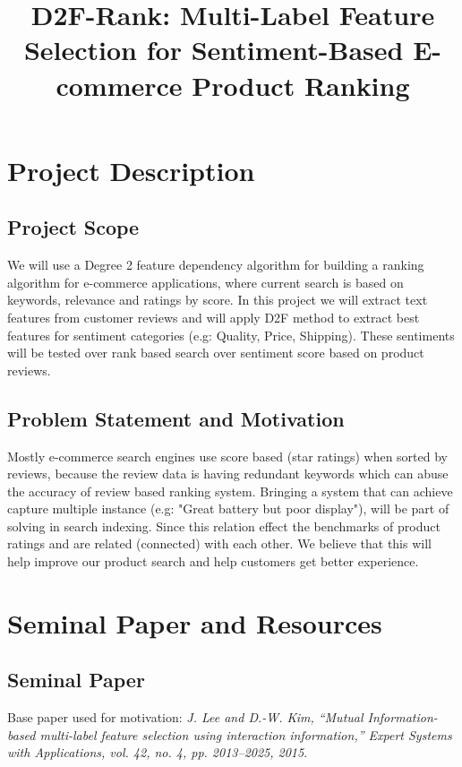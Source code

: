 \documentclass[conference]{IEEEtran}
\begin{document}
\title{D2F-Rank: Multi-Label Feature Selection for Sentiment-Based E-commerce Product Ranking}

\author{
}

\maketitle

\section{Project Description}
\subsection{Project Scope}
We will use a Degree 2 feature dependency algorithm for building a ranking algorithm for e-commerce applications, where current search is based on keywords, relevance and ratings by score. In this project we will extract text features from customer reviews and will apply D2F method to extract best features for sentiment categories (e.g: Quality, Price, Shipping). These sentiments will be tested over rank based search over sentiment score based on product reviews.

\subsection{Problem Statement and Motivation}
Mostly e-commerce search engines use score based (star ratings) when sorted by reviews, because the review data is having redundant keywords which can abuse the accuracy of review based ranking system. Bringing a system that can achieve capture multiple instance (e.g: "Great battery but poor display"), will be part of solving in search indexing. Since this relation effect the benchmarks of product ratings and are related (connected) with each other. We believe that this will help improve our product search and help customers get better experience.

\section{Seminal Paper and Resources}
\subsection{Seminal Paper}
Base paper used for motivation:
\textit{J. Lee and D.-W. Kim, ``Mutual Information-based multi-label feature selection using interaction information,'' Expert Systems with Applications, vol. 42, no. 4, pp. 2013–2025, 2015}.
\end{document}
